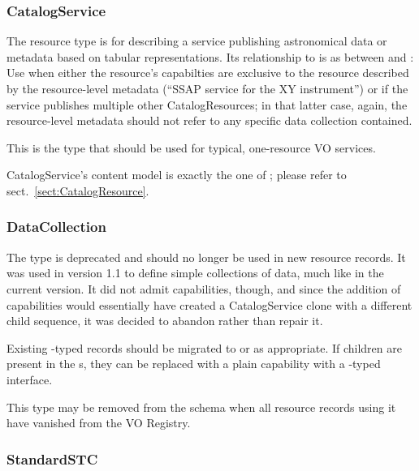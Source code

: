 \documentclass[11pt,a4paper]{ivoa}
\begin{document}


\subsubsection{CatalogService}

The  resource type is for describing a
service publishing astronomical data or metadata based on tabular
representations.  Its relationship to 
is as between 
and : Use  when either
the resource's capabilties are exclusive to the resource described by
the resource-level metadata (``SSAP service for the XY instrument'') or
if the service publishes multiple other CatalogResources; in that latter
case, again, the resource-level metadata should not refer to any
specific data collection contained.

This is the type that should be used for typical, one-resource VO
services.

CatalogService's content model is exactly the one of
; please refer to sect.~\ref{sect:CatalogResource}.

\subsubsection{DataCollection}
\label{sect:datacollection}

The  type is deprecated and should no longer be
used in new resource records.  It was used in version 1.1 to define
simple collections of data, much like  in the
current version.  It did not admit capabilities, though, and since the
addition of capabilities would essentially have created a CatalogService
clone with a different child sequence, it was decided to abandon rather
than repair it.

Existing -typed
records should be migrated to  or
 as appropriate.  If 
children are present in the
s,
they can be replaced with a plain capability with a
-typed interface.

This type may be removed from the schema when all resource records using
it have vanished from the VO Registry.

\subsubsection{StandardSTC}
\end{document}
